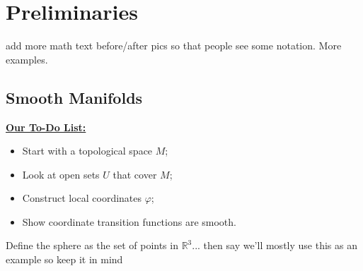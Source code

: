 \documentclass[UKenglish]{beamer}
\newcommand{\R}{\mathbb{R}}
\begin{document}
\section{Preliminaries}

\begin{frame}{}
	add more math text before/after pics so that people see some notation. More examples.
\end{frame}


\subsection{Smooth Manifolds}

\begin{frame}{}
\vfill
\textbf{\underline{Our To-Do List:}}
\begin{itemize}
	\item Start with a topological space $M$;
	\pause
	\item Look at open sets $U$ that cover $M$;
	\pause
	\item Construct local coordinates $\varphi$;
	\pause
	\item Show coordinate transition functions are smooth.
\end{itemize}
\vfill
\end{frame}

\begin{frame}{}
	Define the sphere as the set of points in $\R^3$... then say we'll mostly use this as an example so keep it in mind
\end{frame}

\begin{frame}{}
\vfill
\begin{figure}[H]
	\centering
	\def\svgwidth{0.75\columnwidth}
	
\end{figure}\vfill
\end{frame}

\begin{frame}{}
\vfill
\begin{figure}[H]
	\centering
	\def\svgwidth{.75\columnwidth}
	
\end{figure}
\vfill
\end{frame}

\begin{frame}{}
\vfill
\begin{figure}[H]
	\centering
	\def\svgwidth{\columnwidth}
	
\end{figure}
\vfill
\end{frame}
\end{document}
